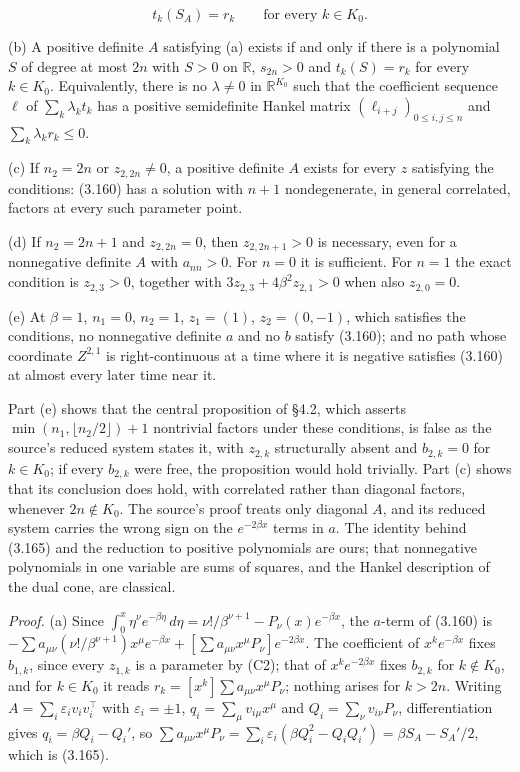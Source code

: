 \documentclass[11pt]{article}
\begin{document}
\begin{equation*}
t_k(S_A)=r_k\qquad\text{for every }k\in K_0. \tag{3.165}\label{eq:3.165}
\end{equation*}

(b) A positive definite \(A\) satisfying (a) exists if and only if there is a polynomial \(S\) of degree at most \(2n\) with \(S>0\) on \(\mathbb R\), \(s_{2n}>0\) and \(t_k(S)=r_k\) for every \(k\in K_0\). Equivalently, there is no \(\lambda\neq0\) in \(\mathbb R^{K_0}\) such that the coefficient sequence \(\ell\) of \(\sum_k\lambda_kt_k\) has a positive semidefinite Hankel matrix \((\ell_{i+j})_{0\le i,j\le n}\) and \(\sum_k\lambda_kr_k\le0\).

(c) If \(n_2=2n\) or \(z_{2,2n}\neq0\), a positive definite \(A\) exists for every \(z\) satisfying the conditions: (3.160) has a solution with \(n+1\) nondegenerate, in general correlated, factors at every such parameter point.

(d) If \(n_2=2n+1\) and \(z_{2,2n}=0\), then \(z_{2,2n+1}>0\) is necessary, even for a nonnegative definite \(A\) with \(a_{nn}>0\). For \(n=0\) it is sufficient. For \(n=1\) the exact condition is \(z_{2,3}>0\), together with \(3z_{2,3}+4\beta^2z_{2,1}>0\) when also \(z_{2,0}=0\).

(e) At \(\beta=1\), \(n_1=0\), \(n_2=1\), \(z_1=(1)\), \(z_2=(0,-1)\), which satisfies the conditions, no nonnegative definite \(a\) and no \(b\) satisfy (3.160); and no path whose coordinate \(Z^{2,1}\) is right-continuous at a time where it is negative satisfies (3.160) at almost every later time near it.

Part (e) shows that the central proposition of \cite{sharef2004conditions} §4.2, which asserts \(\min(n_1,\lfloor n_2/2\rfloor)+1\) nontrivial factors under these conditions, is false as the source's reduced system states it, with \(z_{2,k}\) structurally absent and \(b_{2,k}=0\) for \(k\in K_0\); if every \(b_{2,k}\) were free, the proposition would hold trivially. Part (c) shows that its conclusion does hold, with correlated rather than diagonal factors, whenever \(2n\notin K_0\). The source's proof treats only diagonal \(A\), and its reduced system carries the wrong sign on the \(e^{-2\beta x}\) terms in \(a\). The identity behind (3.165) and the reduction to positive polynomials are ours; that nonnegative polynomials in one variable are sums of squares, and the Hankel description of the dual cone, are classical.

\emph{Proof.} (a) Since \(\int_0^x\eta^\nu e^{-\beta\eta}\,d\eta=\nu!/\beta^{\nu+1}-P_\nu(x)e^{-\beta x}\), the \(a\)-term of (3.160) is \(-\sum a_{\mu\nu}(\nu!/\beta^{\nu+1})x^\mu e^{-\beta x}+[\sum a_{\mu\nu}x^\mu P_\nu]e^{-2\beta x}\). The coefficient of \(x^ke^{-\beta x}\) fixes \(b_{1,k}\), since every \(z_{1,k}\) is a parameter by (C2); that of \(x^ke^{-2\beta x}\) fixes \(b_{2,k}\) for \(k\notin K_0\), and for \(k\in K_0\) it reads \(r_k=[x^k]\sum a_{\mu\nu}x^\mu P_\nu\); nothing arises for \(k>2n\). Writing \(A=\sum_i\varepsilon_iv_iv_i^\top\) with \(\varepsilon_i=\pm1\), \(q_i=\sum_\mu v_{i\mu}x^\mu\) and \(Q_i=\sum_\nu v_{i\nu}P_\nu\), differentiation gives \(q_i=\beta Q_i-Q_i'\), so \(\sum a_{\mu\nu}x^\mu P_\nu=\sum_i\varepsilon_i(\beta Q_i^2-Q_iQ_i')=\beta S_A-S_A'/2\), which is (3.165).
\end{document}
